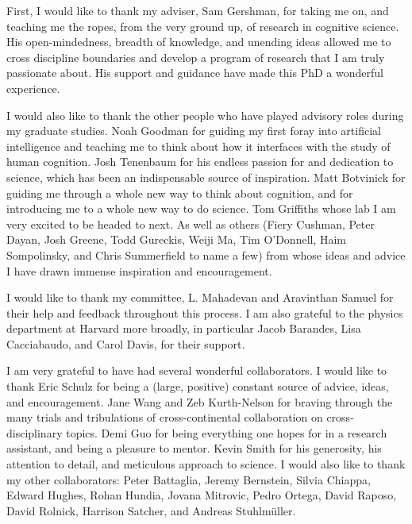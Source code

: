 

First, I would like to thank my adviser, Sam Gershman, for taking me on, and teaching me the ropes, from the very ground up, of research in cognitive science. His open-mindedness, breadth of knowledge, and unending ideas allowed me to cross discipline boundaries and develop a program of research that I am truly passionate about. His support and guidance have made this PhD a wonderful experience.

I would also like to thank the other people who have played advisory roles during my graduate studies. Noah Goodman for guiding my first foray into artificial intelligence and teaching me to think about how it interfaces with the study of human cognition. Josh Tenenbaum for his endless passion for and dedication to science, which has been an indispensable source of inspiration. Matt Botvinick for guiding me through a whole new way to think about cognition, and for introducing me to a whole new way to do science. Tom Griffiths whose lab I am very excited to be headed to next. As well as others (Fiery Cushman, Peter Dayan, Josh Greene, Todd Gureckis, Weiji Ma, Tim O'Donnell, Haim Sompolinsky, and Chris Summerfield to name a few) from whose ideas and advice I have drawn immense inspiration and encouragement.

I would like to thank my committee, L. Mahadevan and Aravinthan Samuel for their help and feedback throughout this process. I am also grateful to the physics department at Harvard more broadly, in particular Jacob Barandes, Lisa Cacciabaudo, and Carol Davis, for their support.

I am very grateful to have had several wonderful collaborators. I would like to thank Eric Schulz for being a (large, positive) constant source of advice, ideas, and encouragement. Jane Wang and Zeb Kurth-Nelson for braving through the many trials and tribulations of cross-continental collaboration on cross-disciplinary topics. Demi Guo for being everything one hopes for in a research assistant, and being a pleasure to mentor. Kevin Smith for his generosity, his attention to detail, and meticulous approach to science. I would also like to thank my other collaborators: Peter Battaglia, Jeremy Bernstein, Silvia Chiappa, Edward Hughes, Rohan Hundia,  Jovana Mitrovic, Pedro Ortega, David Raposo, David Rolnick, Harrison Satcher, and Andreas Stuhlmüller.

